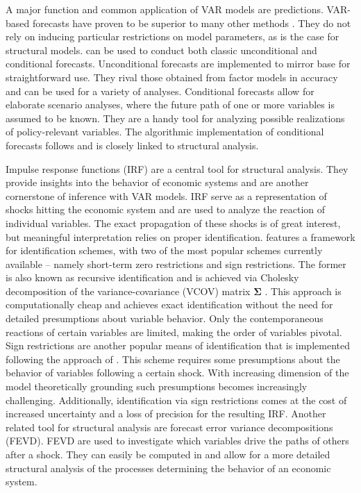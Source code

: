 \documentclass[article,nojss]{jss} %
\begin{document}
A major function and common application of VAR models are predictions. VAR-based forecasts have proven to be superior to many other methods \citep{banbura2010, koop2013}. They do not rely on inducing particular restrictions on model parameters, as is the case for structural models.  can be used to conduct both classic unconditional and conditional forecasts.
Unconditional forecasts are implemented to mirror base  for straightforward use. They rival those obtained from factor models in accuracy \citep{giannone2015} and can be used for a variety of analyses.
Conditional forecasts allow for elaborate scenario analyses, where the future path of one or more variables is assumed to be known. They are a handy tool for analyzing possible realizations of policy-relevant variables. The algorithmic implementation of conditional forecasts follows \cite{waggoner1999} and is closely linked to structural analysis.

Impulse response functions (IRF) are a central tool for structural analysis. They provide insights into the behavior of economic systems and are another cornerstone of inference with VAR models.
IRF serve as a representation of shocks hitting the economic system and are used to analyze the reaction of individual variables. The exact propagation of these shocks is of great interest, but meaningful interpretation relies on proper identification.
 features a framework for identification schemes, with two of the most popular schemes currently available -- namely short-term zero restrictions and sign restrictions. The former is also known as recursive identification and is achieved via Cholesky decomposition of the variance-covariance (VCOV) matrix $\boldsymbol{\Sigma}$ \citep[see][Chapter 8]{kilian2017}. This approach is computationally cheap and achieves exact identification without the need for detailed presumptions about variable behavior. Only the contemporaneous reactions of certain variables are limited, making the order of variables pivotal.
Sign restrictions \citep[see][Chapter 13]{kilian2017} are another popular means of identification that is implemented following the approach of \cite{rubio-ramirez2010}. This scheme requires some presumptions about the behavior of variables following a certain shock. With increasing dimension of the model theoretically grounding such presumptions becomes increasingly challenging. Additionally, identification via sign restrictions comes at the cost of increased uncertainty and a loss of precision for the resulting IRF.
Another related tool for structural analysis are forecast error variance decompositions (FEVD). FEVD are used to investigate which variables drive the paths of others after a shock. They can easily be computed in  and allow for a more detailed structural analysis of the processes determining the behavior of an economic system.
\end{document}
